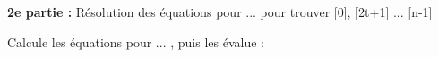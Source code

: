 \begin{maplegroup}
\begin{flushleft}
\textbf{{\large 2e partie : }}Résolution des équations pour 
 ... 
 pour trouver 
[0], 
[2t+1] ... 
[n-1]
\end{flushleft}

\end{maplegroup}
\begin{maplegroup}
\begin{flushleft}
Calcule les équations pour 
 ... 
, puis les évalue :
\end{flushleft}

\end{maplegroup}
